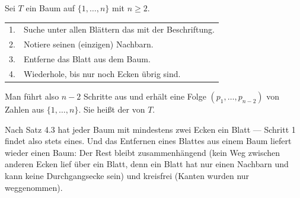 \begin{merksatz}
Sei $T$ ein Baum auf $\{1, \ldots, n\}$ mit $n \ge 2$.

\begin{center}
\renewcommand{\arraystretch}{1.55}
\begin{tabular}{@{}P{1.2cm}P{7.2cm}@{}}
. & Suche unter allen Blättern das mit der  Beschriftung.\\
2. & Notiere seinen (einzigen) Nachbarn.\\
3. & Entferne das Blatt aus dem Baum.\\
4. & Wiederhole, bis nur noch  Ecken übrig sind.\\
\bottomrule
\end{tabular}
\end{center}

Man führt also $n-2$ Schritte aus und erhält eine Folge $(p_1, \ldots, p_{n-2})$ von Zahlen aus $\{1,\ldots,n\}$. Sie heißt der  von $T$.

Nach Satz 4.3 hat jeder Baum mit mindestens zwei Ecken ein Blatt --- Schritt 1 findet also stets eines. Und das Entfernen eines Blattes aus einem Baum liefert wieder einen Baum: Der Rest bleibt zusammenhängend (kein Weg zwischen anderen Ecken lief über ein Blatt, denn ein Blatt hat nur einen Nachbarn und kann keine Durchgangsecke sein) und kreisfrei (Kanten wurden nur weggenommen).
\end{merksatz}


